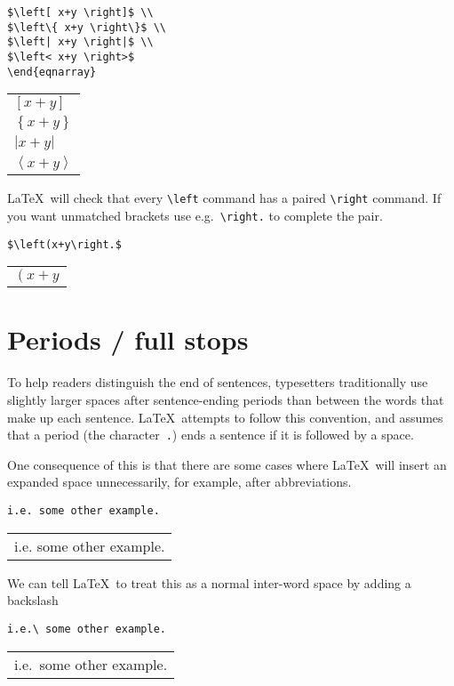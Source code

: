 \documentclass[a4paper]{tufte-handout}
\begin{document}
\begin{lstlisting}
$\left[ x+y \right]$ \\
$\left\{ x+y \right\}$ \\
$\left| x+y \right|$ \\
$\left< x+y \right>$
\end{eqnarray}
\end{lstlisting}
\begin{tabular}{|p{10cm}}
$\left[ x+y \right]$ \\
$\left\{ x+y \right\}$ \\
$\left| x+y \right|$ \\
$\left< x+y \right>$
\end{tabular}

\LaTeX\ will check that every \lstinline{\left} command has a paired \lstinline{\right} command. If you want unmatched brackets use e.g.\ \lstinline{\right.} to complete the pair.
\begin{lstlisting}
$\left(x+y\right.$
\end{lstlisting}
\begin{tabular}{|p{10cm}}
$\left(x+y\right.$
\end{tabular} 

\section{Periods / full stops}
To help readers distinguish the end of sentences, typesetters traditionally use slightly larger spaces after sentence-ending periods than between the words that make up each sentence. \LaTeX\ attempts to follow this convention, and assumes that a period (the character~\lstinline{.}) ends a sentence if it is followed by a space.

One consequence of this is that there are some cases where \LaTeX\ will insert an expanded space unnecessarily, for example, after abbreviations.
\begin{lstlisting}
i.e. some other example.
\end{lstlisting}
\begin{tabular}{|p{10cm}}
i.e. some other example.
\end{tabular}

We can tell \LaTeX\ to treat this as a normal inter-word space by adding a backslash
\begin{lstlisting}
i.e.\ some other example.
\end{lstlisting}
\begin{tabular}{|p{10cm}}
i.e.\ some other example.
\end{tabular}
\end{document}
